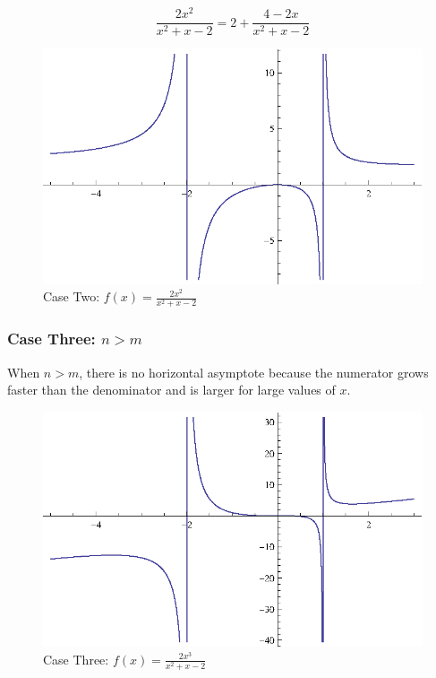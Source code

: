 \documentclass{exam}
\begin{document}
  \[
    \frac{2 x^2}{x^2 + x - 2} = 2 + \frac{4 - 2x}{x^2 + x - 2}
  \]

  \begin{figure}[H]
    \centering
    \includegraphics[scale=1.0]{figure4.eps}
    \caption*{Case Two: $f(x) = \frac{2 x^2}{x^2 + x - 2}$}
  \end{figure}

  \subsubsection{Case Three: $n > m$}

  When $n > m$, there is no horizontal asymptote because the numerator grows faster than the denominator and is larger for
  large values of $x$. 

  \begin{figure}[H]
    \centering
    \includegraphics[scale=1.0]{figure5.eps}
    \caption*{Case Three: $f(x) = \frac{2 x^3}{x^2 + x - 2}$}
  \end{figure}
\end{document}
